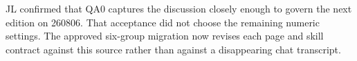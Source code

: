 JL confirmed that QA0 captures the discussion closely enough to govern the next edition on 260806. That acceptance did not choose the remaining numeric settings. The approved six-group migration now revises each page and skill contract against this source rather than against a disappearing chat transcript.

